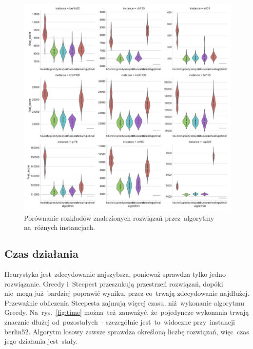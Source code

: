 \begin{figure}[H]
\begin{center}
\includegraphics[width=1.0\textwidth]{graphs/score_comparison_violin.pdf}
\end{center}
\caption{Porównanie rozkładów znalezionych rozwiązań przez~algorytmy na~różnych instancjach.}
\label{fig:distribution}
\end{figure}

\subsection{Czas działania}

Heurystyka jest~zdecydowanie najszybsza, ponieważ sprawdza tylko jedno rozwiązanie. Greedy i~Steepest przeszukują przestrzeń rozwiązań, dopóki nie~mogą już~bardziej poprawić wyniku, przez co~trwają zdecydowanie najdłużej. Przeważnie obliczenia Steepesta zajmują więcej czasu, niż~wykonanie algorytmu Greedy. Na~rys.~\ref{fig:time} można~też~zauważyć, że~pojedyncze wykonania trwają znacznie dłużej od~pozostałych -- szczególnie jest~to~widoczne przy~instancji berlin52. Algorytm losowy zawsze sprawdza określoną liczbę rozwiązań, więc~czas jego działania jest~stały.

